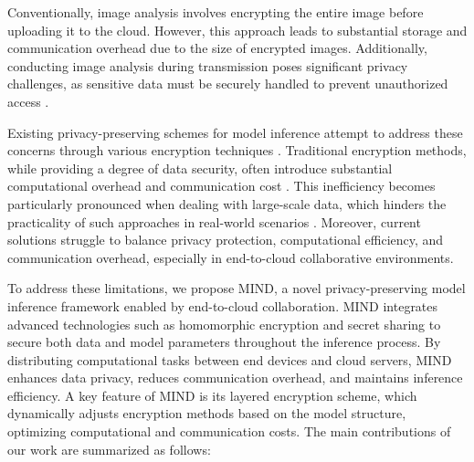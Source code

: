 \documentclass[conference]{IEEEtran}
\begin{document}
Conventionally, image analysis involves encrypting the entire image before uploading it to the cloud. However, this approach leads to substantial storage and communication overhead due to the size of encrypted images. Additionally, conducting image analysis during transmission poses significant privacy challenges, as sensitive data must be securely handled to prevent unauthorized access \cite{van2014datafication}.

Existing privacy-preserving schemes for model inference attempt to address these concerns through various encryption techniques \cite{fu2020vfl}\cite{yang2012efficient}. Traditional encryption methods, while providing a degree of data security, often introduce substantial computational overhead and communication cost \cite{kerschbaum2012outsourced}. This inefficiency becomes particularly pronounced when dealing with large-scale data, which hinders the practicality of such approaches in real-world scenarios \cite{li2015encdb}. Moreover, current solutions struggle to balance privacy protection, computational efficiency, and communication overhead, especially in end-to-cloud collaborative environments.

To address these limitations, we propose MIND, a novel privacy-preserving model inference framework enabled by end-to-cloud collaboration. MIND integrates advanced technologies such as homomorphic encryption and secret sharing to secure both data and model parameters throughout the inference process. By distributing computational tasks between end devices and cloud servers, MIND enhances data privacy, reduces communication overhead, and maintains inference efficiency. A key feature of MIND is its layered encryption scheme, which dynamically adjusts encryption methods based on the model structure, optimizing computational and communication costs. The main contributions of our work are summarized as follows:
\end{document}
